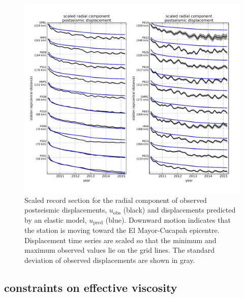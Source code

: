\documentclass[review]{elsarticle}
\begin{document}
\begin{figure}
\includegraphics[scale=0.7]{Figures/RecordSectionElastic}
\caption{Scaled record section for the radial component of observed postseismic displacements, $u_\mathrm{obs}$ (black) and displacements predicted by an elastic model, $u_\mathrm{pred}$ (blue).  Downward motion indicates that the station is moving toward the El Mayor-Cucapah epicentre.  Displacement time series are scaled so that the minimum and maximum observed values lie on the grid lines. The standard deviation of observed displacements are shown in gray.}
\label{fig:RecordSectionElastic}
\end{figure}

\subsection{constraints on effective viscosity}\label{sec:InitialInversion}
\end{document}
